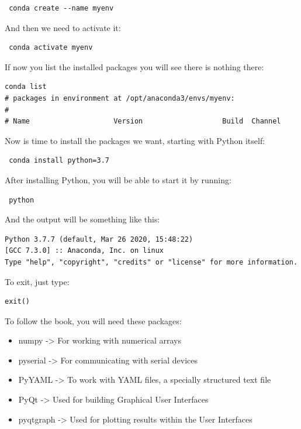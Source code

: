 \begin{verbatim}
 conda create --name myenv
\end{verbatim}


And then we need to activate it:

\begin{verbatim}
 conda activate myenv
\end{verbatim}

If now you list the installed packages you will see there is nothing there:

\begin{verbatim}
conda list
# packages in environment at /opt/anaconda3/envs/myenv:
#
# Name                    Version                   Build  Channel
\end{verbatim}

Now is time to install the packages we want, starting with Python itself:

\begin{verbatim}
 conda install python=3.7
\end{verbatim}


After installing Python, you will be able to start it by running:

\begin{verbatim}
 python
\end{verbatim}

And the output will be something like this:

\begin{verbatim}
Python 3.7.7 (default, Mar 26 2020, 15:48:22) 
[GCC 7.3.0] :: Anaconda, Inc. on linux
Type "help", "copyright", "credits" or "license" for more information.
\end{verbatim}

To exit, just type:

\begin{verbatim}
exit()
\end{verbatim}

To follow the book, you will need these packages:

\begin{itemize}
 \item numpy -> For working with numerical arrays
 \item pyserial -> For communicating with serial devices
 \item PyYAML -> To work with YAML files, a specially structured text file
 \item PyQt -> Used for building Graphical User Interfaces
 \item pyqtgraph -> Used for plotting results within the User Interfaces
\end{itemize}


